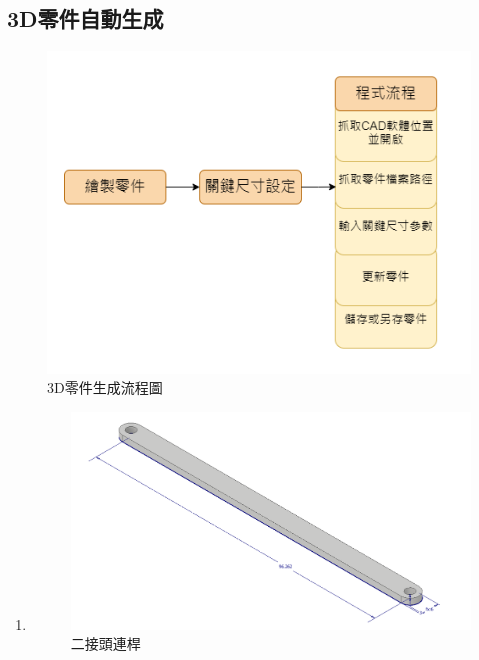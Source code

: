 \documentclass[14pt,a4paper]{report}  %
\newcommand{\fourteen}{\fontsize{14pt}{\baselineskip}\selectfont}%
\begin{document}
{    	\subsection{3D零件自動生成}
	\begin{flushleft}
	\fourteen {完成機構設計後接著就要進入CAD階段，不過在此階段常面臨突然遇到有其他的因素導致需要修改尺寸，此時若以手動將一個個零件一一重新修改會浪費許多時間，因此本專題建立一程式流程來進行參數化修改。}
	\end{flushleft}
	\begin{figure}[hbt!]
        \centering
        \includegraphics[scale=0.6]{3D零件生成.png}
        \caption{3D零件生成流程圖}
        \label{fig_3Dparts:scale}
    	\end{figure} 
	
	
	\begin{enumerate}
	\item{\fourteen{繪製零件:建立後續會用到的零件}
	\begin{figure}[hbt!]
        \centering
        \includegraphics[scale=0.4]{binary_link.png}
        \caption{二接頭連桿}
        \label{fig_binary_link:scale}
        

\end{figure}}
\end{enumerate}}
\end{document}
